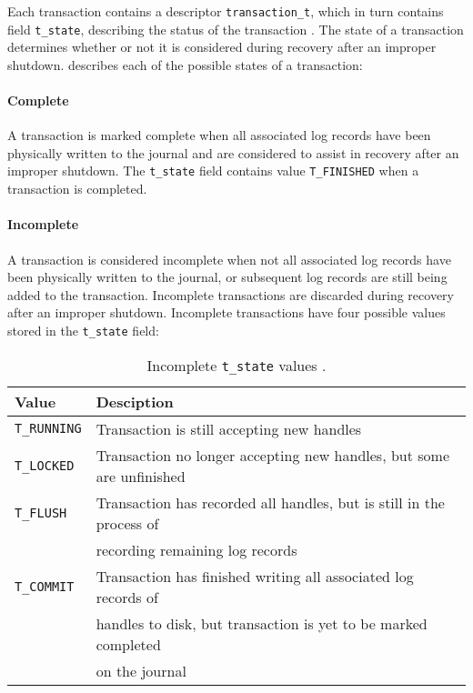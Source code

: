 Each transaction contains a descriptor \texttt{transaction_t}, which in turn contains field \texttt{t_state}, describing the status of the transaction \citep{Bovet2006}. The state of a transaction determines whether or not it is considered during recovery after an improper shutdown. \citet[p. 771]{Bovet2006} describes each of the possible states of a transaction:

\paragraph{Complete}

A transaction is marked complete when all associated log records have been physically written to the journal and are considered to assist in recovery after an improper shutdown. The \texttt{t_state} field contains value \texttt{T_FINISHED} when a transaction is completed.

\paragraph{Incomplete}

A transaction is considered incomplete when not all associated log records have been physically written to the journal, or subsequent log records are still being added to the transaction. Incomplete transactions are discarded during recovery after an improper shutdown. Incomplete transactions have four possible values stored in the \texttt{t_state} field:

\begin{table}[H]
\centering
\caption{Incomplete \texttt{t_state} values \citep[p. 771-772]{Bovet2006}.}
\begin{tabular}{l|l}
Value							& Desciption\\ \hline
\texttt{T_RUNNING}	& Transaction is still accepting new handles \\
\texttt{T_LOCKED}	& Transaction no longer accepting new handles, but some are unfinished \\
\texttt{T_FLUSH}	& Transaction has recorded all handles, but is still in the process of \\ & recording remaining log records \\
\texttt{T_COMMIT}	& Transaction has finished writing all associated log records of \\ & handles to disk, but transaction is yet to be marked completed \\ & on the journal
\end{tabular}
\end{table}

